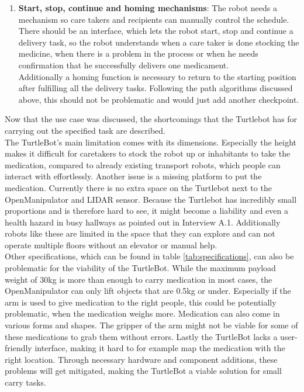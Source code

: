\documentclass[plainarticle,zihtitle,english,final,hyperref,utf8]{zihpub}
\begin{document}
\begin{enumerate}
    \item \textbf{Start, stop, continue and homing mechanisms}: The robot needs a mechanism so care takers and recipients can manually control the schedule. There should be an interface, which lets the robot start, stop and continue a delivery task, so the robot understands when a care taker is done stocking the medicine, when there is a problem in the process or when he needs confirmation that he successfully delivers one medicament. \\
    \newline
    Additionally a homing function is necessary to return to the starting position after fulfilling all the delivery tasks. Following the path algorithms discussed above, this should not be problematic and would just add another checkpoint.
\end{enumerate}
\bigskip
Now that the use case was discussed, the shortcomings that the Turtlebot has for carrying out the specified task are described.\\
\newline
The TurtleBot's main limitation comes with its dimensions. Especially the height makes it difficult for caretakers to stock the robot up or inhabitants to take the medication, compared to already existing transport robots, which people can interact with effortlessly. Another issue is a missing platform to put the medication. Currently there is no extra space on the Turtlebot next to the OpenManipulator and LIDAR sensor. Because the Turtlebot has incredibly small proportions and is therefore hard to see, it might become a liability and even a health hazard in busy hallways as pointed out in Interview A.1. Additionally robots like these are limited in the space that they can explore and can not operate multiple floors without an elevator or manual help.\\
\newline
Other specifications, which can be found in table \ref{tab:specifications}, can also be problematic for the viability of the TurtleBot. While the maximum payload weight of 30kg is more than enough to carry medication in most cases, the OpenManipulator can only lift objects that are 0.5kg or under. Especially if the arm is used to give medication to the right people, this could be potentially problematic, when the medication weighs more. Medication can also come in various forms and shapes. The gripper of the arm might not be viable for some of these medications to grab them without errors. Lastly the TurtleBot lacks a user-friendly interface, making it hard to for example map the medication with the right location. Through necessary hardware and component additions, these problems will get mitigated, making the TurtleBot a viable solution for small carry tasks. \\
\newpage
\end{document}
